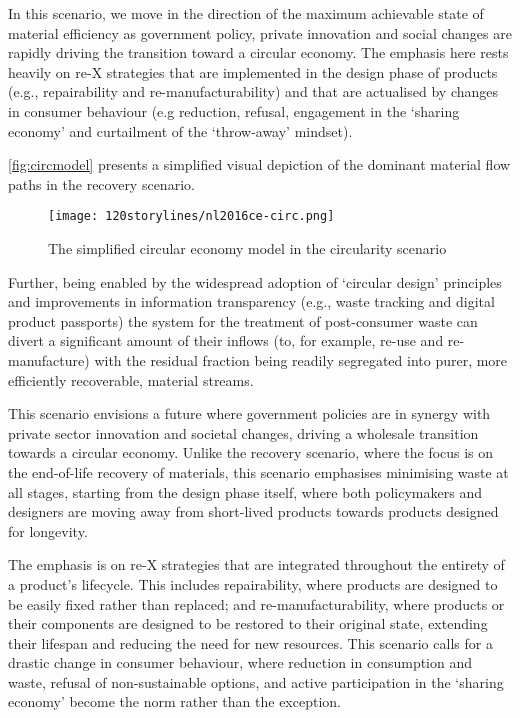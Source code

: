 In this scenario, we move in the direction of the maximum achievable state of material efficiency as government policy, private innovation and social changes are rapidly driving the transition toward a circular economy. The emphasis here rests heavily on re-X strategies that are implemented in the design phase of products (e.g., repairability and re-manufacturability) and that are actualised by changes in consumer behaviour (e.g reduction, refusal, engagement in the `sharing economy' and curtailment of the `throw-away' mindset).

\autoref{fig:circmodel} presents a simplified visual depiction of the dominant material flow paths in the recovery scenario.


\begin{figure}[h!]
  \centering
  \texttt{[image: 120storylines/nl2016ce-circ.png]}
  \caption[The simplified circular economy model in the circularity scenario]{The simplified circular economy model in the circularity scenario~\cite{nl2016ceplan}}
  \label{fig:circmodel}
\end{figure}


Further, being enabled by the widespread adoption of `circular design' principles and improvements in information transparency (e.g., waste tracking and digital product passports) the system for the treatment of post-consumer waste can divert a significant amount of their inflows (to, for example, re-use and re-manufacture) with the residual fraction being readily segregated into purer, more efficiently recoverable, material streams.

This scenario envisions a future where government policies are in synergy with private sector innovation and societal changes, driving a wholesale transition towards a circular economy. Unlike the recovery scenario, where the focus is on the end-of-life recovery of materials, this scenario emphasises minimising waste at all stages, starting from the design phase itself, where both policymakers and designers are moving away from short-lived products towards products designed for longevity.


The emphasis is on re-X strategies that are integrated throughout the entirety of a product's lifecycle. This includes repairability, where products are designed to be easily fixed rather than replaced; and re-manufacturability, where products or their components are designed to be restored to their original state, extending their lifespan and reducing the need for new resources. This scenario calls for a drastic change in consumer behaviour, where reduction in consumption and waste, refusal of non-sustainable options, and active participation in the `sharing economy' become the norm rather than the exception.

